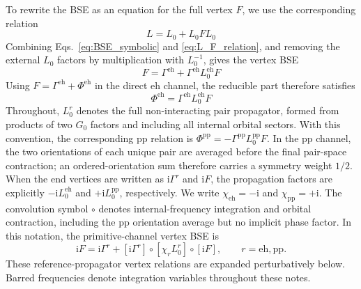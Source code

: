 \documentclass[aip,jcp,reprint,noshowkeys,superscriptaddress]{revtex4-1}
\newcommand{\ii}{\mathrm{i}}
\newcommand{\eh}{\text{eh}}
\newcommand{\pp}{\text{pp}}
\begin{document}
To rewrite the BSE as an equation for the full vertex $F$, we use the corresponding relation
\begin{equation}
	L
	=
	L_0
	+
	L_0 F L_0
	\label{eq:L_F_relation}
\end{equation}
Combining Eqs.~\eqref{eq:BSE_symbolic} and \eqref{eq:L_F_relation}, 
and removing the external $L_0$ factors by multiplication with $L_0^{-1}$, gives the vertex BSE
\begin{equation}
	F
	=
	\Gamma^\eh
	+
	\Gamma^\eh L_0^\eh F
	\label{eq:F_BSE_eh}
\end{equation}
Using $F=\Gamma^\eh+\Phi^\eh$ in the direct $\eh$ channel, the reducible
part therefore satisfies
\begin{equation}
	\Phi^\eh
	=
	\Gamma^\eh L_0^\eh F
	\label{eq:Phi_BSE_eh}
\end{equation}
Throughout, $L_0^r$ denotes the full non-interacting pair propagator,
formed from products of two $G_0$ factors and including all
internal orbital sectors. With this convention, the corresponding $\pp$
relation is $\Phi^\pp=-\Gamma^\pp L_0^\pp F$.
In the $\pp$ channel, the two orientations of each unique pair are averaged
before the final pair-space contraction; an ordered-orientation sum therefore
carries a symmetry weight $1/2$. When the end vertices are written as
$\ii\Gamma^r$ and $\ii F$, the propagation factors are explicitly
$-\ii L_0^\eh$ and $+\ii L_0^\pp$, respectively.
We write $\chi_\eh=-\ii$ and $\chi_\pp=+\ii$.
The convolution symbol $\circ$ denotes internal-frequency integration
and orbital contraction, including the $\pp$ orientation average but no
implicit phase factor. In this notation, the primitive-channel vertex BSE is
\begin{equation}
    \ii F
    =\ii\Gamma^r
    +[\ii\Gamma^r]\circ[\chi_r L_0^r]\circ[\ii F],
    \qquad r=\eh,\pp.
    \label{eq:F_BSE_channel_phases}
\end{equation}
These reference-propagator vertex relations are expanded perturbatively below.
Barred frequencies denote integration variables throughout these notes.
\end{document}
